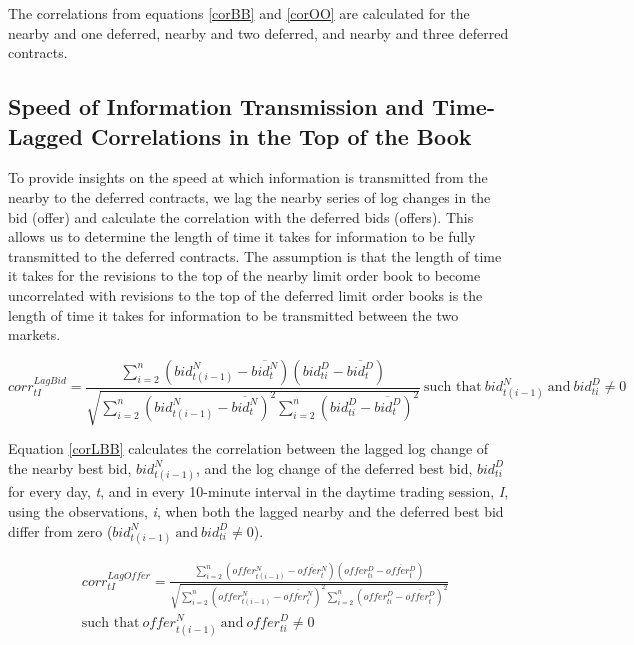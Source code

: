 \documentclass[]{elsarticle} %
\begin{document}
The correlations from equations \ref{corBB} and \ref{corOO} are
calculated for the nearby and one deferred, nearby and two deferred, and
nearby and three deferred contracts.

\subsection{Speed of Information Transmission and Time-Lagged
Correlations in the Top of the
Book}\label{speed-of-information-transmission-and-time-lagged-correlations-in-the-top-of-the-book}

To provide insights on the speed at which information is transmitted
from the nearby to the deferred contracts, we lag the nearby series of
log changes in the bid (offer) and calculate the correlation with the
deferred bids (offers). This allows us to determine the length of time
it takes for information to be fully transmitted to the deferred
contracts. The assumption is that the length of time it takes for the
revisions to the top of the nearby limit order book to become
uncorrelated with revisions to the top of the deferred limit order books
is the length of time it takes for information to be transmitted between
the two markets.

\begin{equation} \label{corLBB}
corr^{LagBid}_{tI} = \frac{\sum\limits_{i=2}^{n} \left(bid_{t(i-1)}^N - \overline{bid_t^N}\right) \left(bid_{ti}^D - \overline{bid_t^D}\right)}{\sqrt{\sum\limits_{i=2}^{n} \left(bid_{t(i-1)}^N - \overline{bid_t^N}\right)^2 \sum\limits_{i=2}^{n}\left(bid_{ti}^D - \overline{bid_t^D}\right)^2}} \: \textrm{such that} \: {bid_{t(i-1)}^N \: \textrm{and} \: bid_{ti}^D} \neq 0
\end{equation}

Equation \ref{corLBB} calculates the correlation between the lagged log
change of the nearby best bid, \(bid_{t(i-1)}^N\), and the log change of
the deferred best bid, \(bid_{ti}^D\) for every day, \emph{t}, and in
every 10-minute interval in the daytime trading session, \emph{I}, using
the observations, \emph{i}, when both the lagged nearby and the deferred
best bid differ from zero
(\({bid_{t(i-1)}^N \: \textrm{and} \: bid_{ti}^D} \neq 0\)).

\begin{equation} \label{corLOO}
\begin{split}
& corr^{LagOffer}_{tI}  = \frac{\sum\limits_{i=2}^{n} \left(offer_{t(i-1)}^N - \overline{offer_t^N}\right) \left(offer_{ti}^D - \overline{offer_t^D}\right)}{\sqrt{\sum\limits_{i=2}^{n} \left(offer_{t(i-1)}^N - \overline{offer_t^N}\right)^2 \sum\limits_{i=2}^{n}\left(offer_{ti}^D - \overline{offer_t^D}\right)^2}} \\
& \textrm{such that} \: {offer_{t(i-1)}^N \: \textrm{and} \: offer_{ti}^D} \neq 0
\end{split}
\end{equation}
\end{document}
